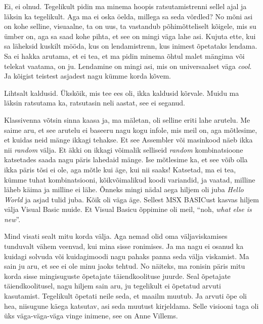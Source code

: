 
Ei, ei olnud. Tegelikult pidin ma minema hoopis ratsutamistrenni sellel ajal ja 
läksin ka tegelikult. Aga ma ei oska öelda, millega sa seda võrdled? No mõni 
asi on kohe selline,  visuaalne, ta on uus, ta vastandub  
põhimõtteliselt kõigele, mis su ümber on, aga sa saad kohe pihta, et see on 
mingi väga lahe asi. Kujuta ette, kui sa läheksid kuskilt mööda, kus on 
lendamistrenn, kus inimest õpetataks lendama. Sa ei  hakka arutama, et ei tea, 
et ma pidin  minema õhtul  malet mängima või telekat vaatama, on ju.  
Lendamine on  mingi asi, mis on universaalset väga \emph{cool}. Ja kõigist 
teistest asjadest nagu kümme korda kõvem.


Lihtsalt kaldusid. Ükskõik, mis tee ees oli, ikka kaldusid kõrvale. 
Muidu ma läksin ratsutama ka, ratsutasin neli aastat, see ei seganud.

Klassivenna võtsin sinna kaasa ja, ma mäletan, oli selline eriti lahe  
arutelu. Me saime aru, et see arutelu ei baseeru nagu kogu infole, mis meil on, 
aga mõtlesime, et kuidas neid mänge ikkagi tehakse. Et see Assembler või 
masinkood näeb ikka nii \emph{random} välja. Et äkki on ikkagi 
võimalik selliseid \emph{random} kombinatsioone katsetades saada nagu päris 
lahedaid mänge. Ise mõtlesime ka, et see võib olla ikka päris tõsi ei ole, 
aga mõtle kui äge, kui nii saaks! Katsetad,  ma ei tea, kümme tuhat 
kombinatsiooni, kõikvõimalikud koodi variandid, ja vaatad,  milline läheb käima 
ja milline ei lähe. Õnneks mingi nädal aega hiljem oli juba  \emph{Hello 
World} ja asjad tulid juba. Kõik oli  väga äge. Sellest MSX 
BASICust  kasvas hiljem välja Visual 
Basic muide. Et Visual Basicu õppimine oli meil, 
\enquote{noh, \emph{what else is new}}.


Mind visati sealt mitu korda välja. Aga nemad olid oma väljaviskamises 
tunduvalt vähem veenvad, kui mina sisse ronimises. Ja ma nagu ei osanud ka  
kuidagi solvuda või kuidagimoodi nagu pahaks panna seda välja viskamist.  
Ma sain ju aru, et see ei ole minu jaoks tehtud. No näiteks, ma ronisin päris 
mitu korda sisse mingisuguste õpetajate täiendkoolituse juurde. Seal õpetajate 
täiendkoolitusel, nagu hiljem sain aru, ju tegelikult ei õpetatud 
arvuti kasutamist. Tegelikult õpetati neile seda, et maailm muutub. Ja arvuti õpe oli 
hea, niisugune käega katsutav, asi seda muutust kirjeldama. Selle visiooni taga oli üks 
väga-väga-väga vinge inimene, see on Anne Villems.

